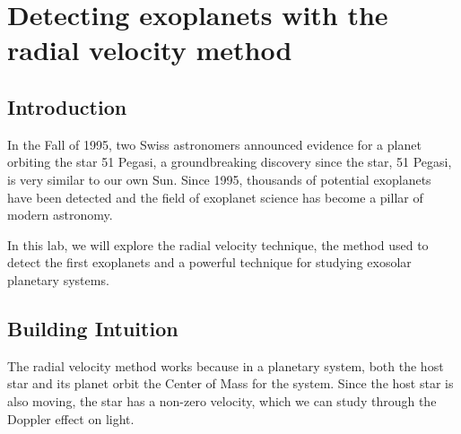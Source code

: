 \chapter{Detecting exoplanets with the radial velocity method}



\section{Introduction}

In the Fall of 1995, two Swiss astronomers announced evidence for a planet orbiting the star 51 Pegasi, a groundbreaking discovery since the star, 51 Pegasi, is very similar to our own Sun. Since 1995, thousands of potential exoplanets have been detected and the field of exoplanet science has become a pillar of modern astronomy.

In this lab, we will explore the radial velocity technique, the method used to detect the first exoplanets and a powerful technique for studying exosolar planetary systems.



\section{Building Intuition}

The radial velocity method works because in a planetary system, both the host star and its planet orbit the Center of Mass for the system. Since the host star is also moving, the star has a non-zero velocity, which we can study through the Doppler effect on light.

